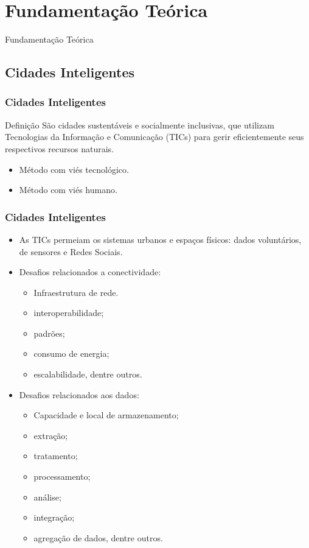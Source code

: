 \documentclass{beamer}
\begin{document}
\section{Fundamentação Teórica}
\begin{frame}
\Huge{\centerline{Fundamentação Teórica}}
\end{frame}
\subsection{Cidades Inteligentes}
\begin{frame}
\frametitle{Cidades Inteligentes}
\begin{block}{Definição}
São cidades sustentáveis e socialmente inclusivas, que utilizam Tecnologias da Informação e Comunicação (TICs) para gerir eficientemente seus respectivos recursos naturais.
\begin{itemize}
\item Método com viés tecnológico.
\item Método com viés humano.
\end{itemize}
\end{block}

\end{frame}
\begin{frame}
\frametitle{Cidades Inteligentes}
\begin{itemize}
\item As TICs permeiam os sistemas urbanos e espaços físicos: dados voluntários, de sensores e Redes Sociais.
\item Desafios relacionados a conectividade:
\begin{itemize}
\item Infraestrutura de rede.
\item interoperabilidade;
\item padrões;
\item consumo de energia;
\item escalabilidade, dentre outros.
\end{itemize}
\item Desafios relacionados aos dados:
\begin{itemize}
\item Capacidade e local de armazenamento;
\item extração;
\item tratamento;
\item processamento;
\item análise;
\item integração;
\item agregação de dados, dentre outros.
\end{itemize}
\end{itemize}
\end{frame}
\end{document}

